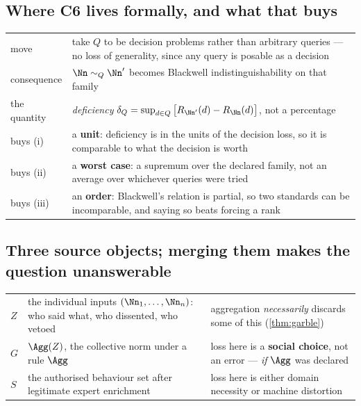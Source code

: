 \subsection{Where C6 lives formally, and what that buys}

\begin{table}[H]\centering\small
\begin{tabularx}{\textwidth}{P{3.0cm}Y}
\toprule
move & take $Q$ to be decision problems rather than arbitrary queries --- no loss
of generality, since any query is posable as a decision\\
consequence & $\Nn\sim_Q\Nn'$ becomes Blackwell indistinguishability on that
family\\
the quantity & \emph{deficiency}
$\delta_Q=\sup_{d\in Q}\big[R_{\Nn'}(d)-R_{\Nn}(d)\big]$, not a percentage\\
\midrule
buys (i) & a \textbf{unit}: deficiency is in the units of the decision loss, so it
is comparable to what the decision is worth\\
buys (ii) & a \textbf{worst case}: a supremum over the declared family, not an
average over whichever queries were tried\\
buys (iii) & an \textbf{order}: Blackwell's relation is partial, so two standards
can be incomparable, and saying so beats forcing a rank\\
\bottomrule
\end{tabularx}
\end{table}

\subsection{Three source objects; merging them makes the question unanswerable}

\begin{table}[H]\centering\small
\begin{tabularx}{\textwidth}{P{1.1cm}P{4.4cm}Y}
\toprule
$Z$ & the individual inputs $(\Nn_1,\dots,\Nn_n)$: who said what, who dissented,
who vetoed & aggregation \emph{necessarily} discards some of this
(\cref{thm:garble})\\
$G$ & $\Agg(Z)$, the collective norm under a rule $\Agg$ & loss here is a
\textbf{social choice}, not an error --- \emph{if} $\Agg$ was declared\\
$S$ & the authorised behaviour set after legitimate expert enrichment & loss here
is either domain necessity or machine distortion\\
\bottomrule
\end{tabularx}
\end{table}

